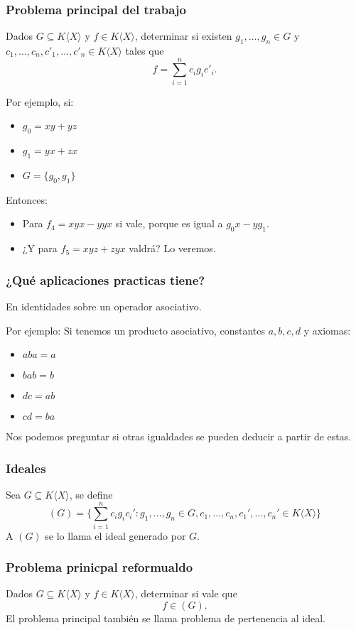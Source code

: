 \documentclass[spanish, aspectratio=169, hidecontrols]{beamer}
\begin{document}
\begin{frame}
  \frametitle{Problema principal del trabajo}
  Dados $G ⊆ K⟨X⟩$ y $f ∈ K⟨X⟩$, determinar si existen $g_1, …, g_n ∈ G$ y $c_1, …, c_n, c'_1, …, c'_n ∈ K⟨X⟩$ tales que
  \[ f = ∑_{i = 1}^n c_i g_i c'_i \text{.}\]
  \pause
  \begin{exampleblock}{Por ejemplo, si:}
    \begin{itemize}
      \item $g_0 = xy + yz$
      \item $g_1 = yx + zx$
      \item $G = \{g_0, g_1\}$
    \end{itemize}
    Entonces:
    \begin{itemize}
      \item Para $f_4 = xyx - yyx$ si vale\pause, porque es igual a $g_0 x - y g_1$. %
      \pause
      \item ¿Y para $f_5 = xyz + zyx$ valdrá? \pause Lo veremos.
    \end{itemize}
  \end{exampleblock}

\end{frame}

\begin{frame}
  \frametitle{¿Qué aplicaciones practicas tiene?}

  En identidades sobre un operador asociativo.
  \begin{exampleblock}{Por ejemplo:}
    Si tenemos un producto asociativo, constantes $a, b, c, d$ y axiomas:
    \begin{itemize}
      \item $aba = a$
      \item $bab = b$
      \item $dc = ab$
      \item $cd = ba$
    \end{itemize}
    Nos podemos preguntar si otras igualdades se pueden deducir a partir de estas.
  \end{exampleblock}
\end{frame}

\begin{frame}
  \frametitle{Ideales}
  \pause
  Sea $G ⊆ K⟨X⟩$, se define
  \[ (G) = \{∑_{i = 1}^n c_i g_i c_i' : g_1, …, g_n ∈ G, c_1, …, c_n, c_1', …, c_n' ∈ K⟨X⟩\} \]
  A $(G)$ se lo llama el ideal generado por $G$.
\end{frame}

\begin{frame}
  \frametitle{Problema prinicpal reformualdo}
  Dados $G ⊆ K⟨X⟩$ y $f ∈ K⟨X⟩$, determinar si vale que
  \[ f ∈ (G) \text{.} \]
  \pause
  El problema principal también se llama problema de pertenencia al ideal.
\end{frame}
\end{document}
